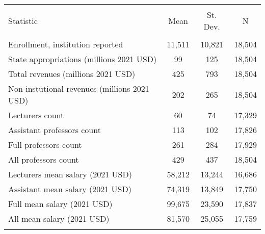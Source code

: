 
\begin{tabular}{@{\extracolsep{5pt}}lccc} 
\\[-1.8ex]\hline 
\hline \\[-1.8ex] 
Statistic & \multicolumn{1}{c}{Mean} & \multicolumn{1}{c}{St. Dev.} & \multicolumn{1}{c}{N} \\ 
\hline \\[-1.8ex] 
Enrollment, institution reported & 11,511 & 10,821 & 18,504 \\ 
State appropriations (millions 2021 USD) & 99 & 125 & 18,504 \\ 
Total revenues (millions 2021 USD) & 425 & 793 & 18,504 \\ 
Non-instutional revenues (millions 2021 USD) & 202 & 265 & 18,504 \\ 
Lecturers count & 60 & 74 & 17,329 \\ 
Assistant professors count & 113 & 102 & 17,826 \\ 
Full professors count & 261 & 284 & 17,929 \\ 
All professors count & 429 & 437 & 18,504 \\ 
Lecturers mean salary (2021 USD) & 58,212 & 13,244 & 16,686 \\ 
Assistant mean salary (2021 USD) & 74,319 & 13,849 & 17,750 \\ 
Full mean salary (2021 USD) & 99,675 & 23,590 & 17,837 \\ 
All mean salary (2021 USD) & 81,570 & 25,055 & 17,759 \\ 
\hline \\[-1.8ex] 
\end{tabular} 
